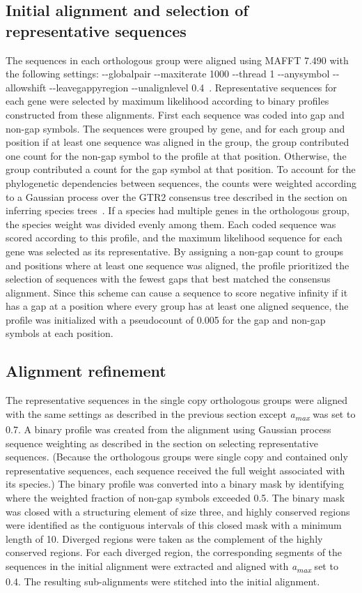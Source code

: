 \subsection{Initial alignment and selection of representative sequences}
The sequences in each orthologous group were aligned using MAFFT 7.490 with the following settings: -{}-globalpair -{}-maxiterate 1000 -{}-thread 1 -{}-anysymbol -{}-allowshift -{}-leavegappyregion -{}-unalignlevel 0.4~\cite{Katoh2013}. Representative sequences for each gene were selected by maximum likelihood according to binary profiles constructed from these alignments. First each sequence was coded into gap and non-gap symbols. The sequences were grouped by gene, and for each group and position if at least one sequence was aligned in the group, the group contributed one count for the non-gap symbol to the profile at that position. Otherwise, the group contributed a count for the gap symbol at that position. To account for the phylogenetic dependencies between sequences, the counts were weighted according to a Gaussian process over the GTR2 consensus tree described in the section on inferring species trees~\cite{Altschul1989}. If a species had multiple genes in the orthologous group, the species weight was divided evenly among them. Each coded sequence was scored according to this profile, and the maximum likelihood sequence for each gene was selected as its representative. By assigning a non-gap count to groups and positions where at least one sequence was aligned, the profile prioritized the selection of sequences with the fewest gaps that best matched the consensus alignment. Since this scheme can cause a sequence to score negative infinity if it has a gap at a position where every group has at least one aligned sequence, the profile was initialized with a pseudocount of 0.005 for the gap and non-gap symbols at each position.

\subsection{Alignment refinement}
The representative sequences in the single copy orthologous groups were aligned with the same settings as described in the previous section except \textit{a\textsubscript{max}} was set to 0.7. A binary profile was created from the alignment using Gaussian process sequence weighting as described in the section on selecting representative sequences. (Because the orthologous groups were single copy and contained only representative sequences, each sequence received the full weight associated with its species.) The binary profile was converted into a binary mask by identifying where the weighted fraction of non-gap symbols exceeded 0.5. The binary mask was closed with a structuring element of size three, and highly conserved regions were identified as the contiguous intervals of this closed mask with a minimum length of 10. Diverged regions were taken as the complement of the highly conserved regions. For each diverged region, the corresponding segments of the sequences in the initial alignment were extracted and aligned with \textit{a\textsubscript{max}} set to 0.4. The resulting sub-alignments were stitched into the initial alignment.


